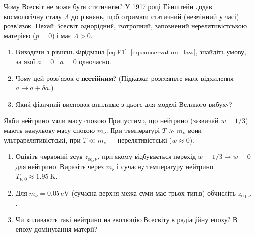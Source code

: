 \begin{problem}{Чому Всесвіт не може бути статичним?}
У 1917 році Ейнштейн додав космологічну сталу \(\Lambda\) до рівнянь,
щоб отримати статичний (незмінний у часі) розв'язок.
Нехай Всесвіт однорідний, ізотропний, заповнений
нерелятивістською матерією (\(p=0\)) і має \(\Lambda > 0\).

\begin{enumerate}
    \item Виходячи з рівнянь Фрідмана \eqref{eq:F1}--\eqref{eq:conservation_law},
          знайдіть умову, за якої \(\dot{a}=0\) і \(\ddot{a}=0\) одночасно.
    \item Чому цей розв'язок є \textbf{нестійким}?
          (Підказка: розгляньте мале відхилення \(a \to a + \delta a\).)
    \item Який фізичний висновок випливає з цього для моделі Великого вибуху?
\end{enumerate}
\end{problem}


\begin{problem}{Якби нейтрино мали масу спокою}
Припустимо, що нейтрино (зазвичай \(w=1/3\)) мають ненульову масу спокою
\(m_\nu\). При температурі \(T \gg m_\nu\) вони ультрарелятивістські,
при \(T \ll m_\nu\) — нерелятивістські (\(w \approx 0\)).

\begin{enumerate}
    \item Оцініть червоний зсув \(z_{\text{eq},\nu}\), при якому відбувається
          перехід \(w=1/3 \to w=0\) для нейтрино.
          Виразіть через \(m_\nu\) і сучасну температуру нейтрино
          \(T_{\nu,0} \approx 1.95\ \text{K}\).
    \item Для \(m_\nu = 0.05\ \text{eV}\) (сучасна верхня межа суми мас трьох типів)
          обчисліть \(z_{\text{eq},\nu}\).
    \item Чи впливають такі нейтрино на еволюцію Всесвіту в радіаційну епоху?
          В епоху домінування матерії?
\end{enumerate}
\end{problem}


